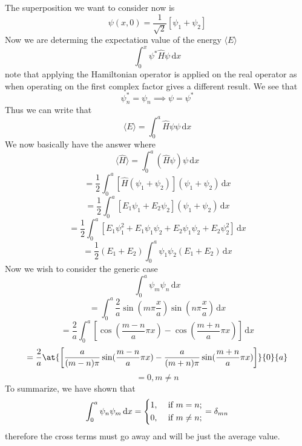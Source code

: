\begin{remark}
The superposition we want to consider now is 
    \[
        \psi (x, 0) = \frac{1}{\sqrt{2} } \left[ \psi _1 + \psi _2 \right] 
    \]
    Now we are determing the expectation value of the energy \(\langle E \rangle \) 
    \[
        \int_{0}^{x} \psi ^* \hat{H} \psi  \,\mathrm{d}x 
    \] note that applying the Hamiltonian operator is applied on the real operator as when operating on the first complex factor 
    gives a different result. We see that 
    \[
        \psi _n ^* = \psi _n \implies \psi = \psi ^*
    \]
    Thus we can write that 
    \[
        \langle E \rangle = \int_{0}^{a}  \hat{H} \psi \psi \,\mathrm{d}x 
    \]
    We now basically have the answer where 
    \[
        \langle \hat{H}  \rangle = \int_{0}^{a}  (\hat{H} \psi ) \psi \,\mathrm{d}x 
    \]
    \[
        =\frac{1}{2} \int_{0}^{a}  \left[ \hat{H} (\psi _1 + \psi _2) \right] (\psi _1 +\psi _2) \,\mathrm{d}x 
    \]
    \[
        =\frac{1}{2} \int_{0}^{a}  \left[ E_1\psi _1 + E_2 \psi _2  \right](\psi _1+\psi _2) \,\mathrm{d}x 
    \]
    \[
        =\frac{1}{2} \int_{0}^{a} \left[ E_1 \psi _1 ^{2}  + E_1 \psi _1 \psi _2 +E_2 \psi _1 \psi _2 + E_2 \psi _2 ^{2}  \right]   \,\mathrm{d}x 
    \]
    \[
        = \frac{1}{2}\left( E_1 + E_2 \right) \int_{0}^{a} \psi _1 \psi _2 (E_1 + E_2)  \,\mathrm{d}x 
    \]
    Now we wish to consider the generic case 
    \[
        \int_{0}^{a}  \psi _m \psi _ n\,\mathrm{d}x 
    \]
    \[
        = \int_{0}^{a}\frac{2}{a} \sin (m \pi \frac{x}{a}) \sin (n \pi  \frac{x}{a})  \,\mathrm{d}x 
    \]
    \[
        = \frac{2}{a} \int_{0}^{a} \left[ \cos (\frac{m-n}{a} \pi x) - \cos (\frac{m+n}{a}\pi x) \right]   \,\mathrm{d}x 
    \]
    \[
        =\frac{2}{a} \at{\left[ \frac{a}{(m-n)\pi }\sin (\frac{m-n}{a} \pi x) - \frac{a}{(m+n) \pi } \sin (\frac{m+n}{a}\pi x) \right] }{0}{a} 
    \]
    \[
        =0 , m\neq  n
    \]
    To summarize, we have shown that 
    \[
        \int_{0}^{a} \psi _n \psi _m  \,\mathrm{d}x =  \begin{dcases}
            1, &\text{ if } m=n  ;\\
            0, &\text{ if } m \neq  n;\\
        \end{dcases} = \delta_{mn} 
    \]
    therefore the cross terms must go away and will be just the average value. 
\end{remark}
